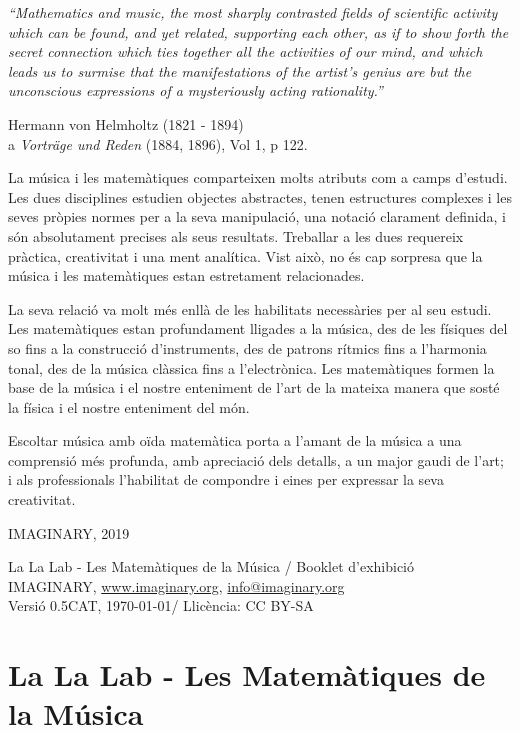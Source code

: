 \epigraph{ \itshape ``Mathematics and music, the most sharply contrasted fields of scientific activity which can be found, and yet related, supporting each other, as if to show forth the secret connection which ties together all the activities of our mind, and which leads us to surmise that the  manifestations of the artist's genius are but the unconscious expressions of a mysteriously acting rationality.''
}
{\vspace{0.5em}Hermann von Helmholtz (1821 - 1894) \\
a \textit{Vorträge und Reden} (1884, 1896), Vol 1, p 122.}

La música i les matemàtiques comparteixen molts atributs com a camps d'estudi. Les dues disciplines estudien objectes abstractes, tenen estructures complexes i les seves pròpies normes per a la seva manipulació, una notació clarament definida, i són absolutament precises als seus resultats. Treballar a les dues requereix pràctica, creativitat i una ment analítica. Vist això, no és cap sorpresa que la música i les matemàtiques estan estretament relacionades.

La seva relació va molt més enllà de les habilitats necessàries per al seu estudi. Les matemàtiques estan profundament lligades a la música, des de les físiques del so fins a la construcció d'instruments, des de patrons rítmics fins a l'harmonia tonal, des de la música clàssica fins a l'electrònica. Les matemàtiques formen la base de la música i el nostre enteniment de l'art de la mateixa manera que sosté la física i el nostre enteniment del món.

Escoltar música amb oïda matemàtica porta a l'amant de la música a una comprensió més profunda, amb apreciació dels detalls, a un major gaudi de l'art; i als professionals l'habilitat de compondre i eines per  expressar la seva creativitat.

\begin{flushright}
IMAGINARY, 2019 %
\end{flushright}

\vfill
La La Lab - Les Matemàtiques de la Música / Booklet d'exhibició \\
IMAGINARY, \url{www.imaginary.org}, \href{mailto:info@imaginary.org}{info@imaginary.org} \\
Versió 0.5CAT, \today / Llicència: CC BY-SA


\section*{La La Lab - Les Matemàtiques de la Música}

